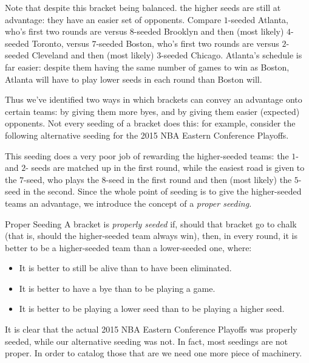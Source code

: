 \documentclass[../main.tex]{subfiles}
\begin{document}
Note that despite this bracket being balanced. the higher seeds are still at advantage: they have an easier set of opponents. Compare $1$-seeded Atlanta, who's first two rounds are versus $8$-seeded Brooklyn and then (most likely) $4$-seeded Toronto, versus $7$-seeded Boston, who's first two rounds are versus $2$-seeded Cleveland and then (most likely) $3$-seeded Chicago. Atlanta's schedule is far easier: despite them having the same number of games to win as Boston, Atlanta will have to play lower seeds in each round than Boston will.

Thus we've identified two ways in which brackets can convey an advantage onto certain teams: by giving them more byes, and by giving them easier (expected) opponents. Not every seeding of a bracket does this: for example, consider the following alternative seeding for the 2015 NBA Eastern Conference Playoffs.


This seeding does a very poor job of rewarding the higher-seeded teams: the $1$- and $2$- seeds are matched up in the first round, while the easiest road is given to the $7$-seed, who plays the $8$-seed in the first round and then (most likely) the $5$-seed in the second. Since the whole point of seeding is to give the higher-seeded teams an advantage, we introduce the concept of a \textit{proper seeding.}

\begin{definition}{Proper Seeding}{}
    A bracket is \textit{properly seeded} if, should that bracket go to chalk (that is, should the higher-seeded team always win), then, in every round, it is better to be a higher-seeded team than a lower-seeded one, where: \begin{itemize}
        \item It is better to still be alive than to have been eliminated.
        \item It is better to have a bye than to be playing a game.
        \item It is better to be playing a lower seed than to be playing a higher seed.
    \end{itemize}
\end{definition}
It is clear that the actual 2015 NBA Eastern Conference Playoffs was properly seeded, while our alternative seeding was not. In fact, most seedings are not proper. In order to catalog those that are we need one more piece of machinery.
\end{document}
